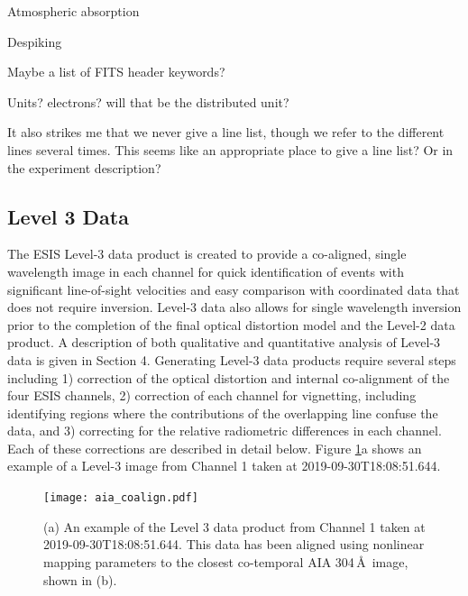 	Atmospheric absorption
	
	Despiking
	
	Maybe a list of FITS header keywords?  
	
	Units?  electrons?  will that be the distributed unit?
	
	It also strikes me that we never give a line list, though we refer to the different lines several times.  This seems like an appropriate place to give a line list?  Or in the experiment description?

    \subsection{Level 3 Data}
 
    
    	\newcommand{\vigfit}{[0.44, 0.34, 0.38, 0.5]}
    	\newcommand{\levthreetime}{2019-09-30T18:08:51.644}
    	
    	The ESIS Level-3 data product is created to provide a co-aligned, single wavelength image in each channel for quick identification of events with significant line-of-sight velocities and easy comparison with coordinated data that does not require inversion. 
    	Level-3 data also allows for single wavelength inversion prior to the completion of the final optical distortion model and the Level-2 data product.  A description of both qualitative and quantitative analysis of Level-3 data is given in Section 4.  Generating Level-3 data products require several steps including 1) correction of the optical distortion and internal co-alignment of the four ESIS channels, 2) correction of each channel for vignetting, including identifying regions where the contributions of the overlapping \mgxbright line confuse the \ov data, and 3) correcting for the relative radiometric differences in each channel.  Each of these corrections are described in detail below. 
    	Figure \ref{fig:coalign}a shows an example of a Level-3 image from Channel 1 taken at \levthreetime.
    	
  		\begin{figure}[htb!]
    		\centering
    		\texttt{[image: aia\_coalign.pdf]}
    		\caption{(a) An example of the Level 3 data product from Channel 1 taken at \levthreetime. This data has been aligned using nonlinear mapping parameters to the closest co-temporal AIA 304\,\AA\ image, shown in (b).   }
    		\label{fig:coalign}
    	\end{figure}
    	
    
  
